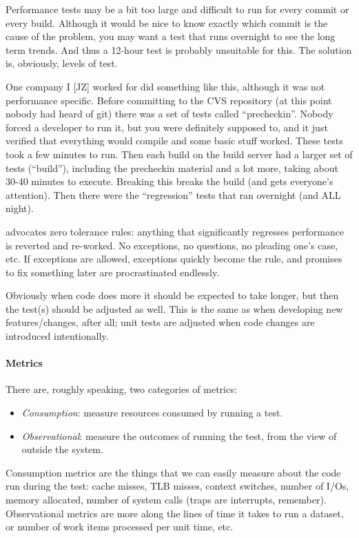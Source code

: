 \documentclass[a4paper]{report}
\begin{document}
Performance tests may be a bit too large and difficult to run for every commit or every build. Although it would be nice to know exactly which commit is the cause of the problem, you may want a test that runs overnight to see the long term trends. And thus a 12-hour test is probably unsuitable for this. The solution is, obviously, levels of test. 

One company I [JZ] worked for did something like this, although it was not performance specific. Before committing to the CVS repository (at this point nobody had heard of git) there was a set of tests called ``precheckin''. Nobody forced a developer to run it, but you were definitely supposed to, and it just verified that everything would compile and some basic stuff worked. These tests took a few minutes to run. Then each build on the build server had a larger set of tests (``build''), including the precheckin material and a lot more, taking about 30-40 minutes to execute. Breaking this breaks the build (and gets everyone's attention). Then there were the ``regression'' tests that ran overnight (and ALL night).

\cite{perfculture} advocates zero tolerance rules: anything that significantly regresses performance is reverted and re-worked. No exceptions, no questions, no pleading one's case, etc. If exceptions are allowed, exceptions quickly become the rule, and promises to fix something later are procrastinated endlessly.

Obviously when code does more it should be expected to take longer, but then the test(s) should be adjusted as well. This is the same as when developing new features/changes, after all; unit tests are adjusted when code changes are introduced intentionally.

\paragraph{Metrics} There are, roughly speaking, two categories of metrics:

\begin{itemize}
	\item \textit{Consumption}: measure resources consumed by running a test.
	\item \textit{Observational}: measure the outcomes of running the test, from the view of outside the system.
\end{itemize}

Consumption metrics are the things that we can easily measure about the code run during the test: cache misses, TLB misses, context switches, number of I/Os, memory allocated, number of system calls (traps are interrupts, remember). Observational metrics are more along the lines of time it takes to run a dataset, or number of work items processed per unit time, etc.
\end{document}
